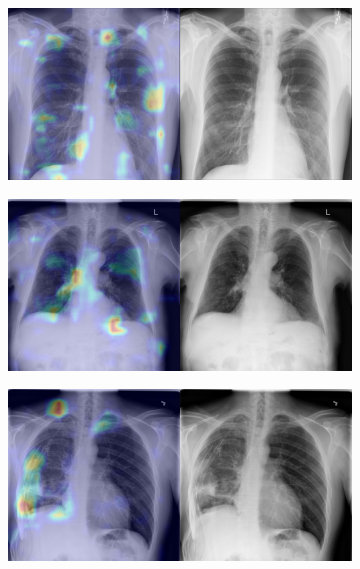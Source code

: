 \begin{figure}[b]
\begin{subfigure}{0.4\textwidth}
    \end{subfigure}
    \begin{subfigure}{0.4\textwidth}
        \centering
        \includegraphics[width=1.0\textwidth]{Chapters/5. Conclusiones/img/Emphysema/1_1_00012298_007.png}
    \end{subfigure}
    \begin{subfigure}{0.4\textwidth}
        \centering
        \includegraphics[width=1.0\textwidth]{Chapters/5. Conclusiones/img/Emphysema/1_1_00015387_000.png}
    \end{subfigure}
    \begin{subfigure}{0.4\textwidth}
        \centering
        \includegraphics[width=1.0\textwidth]{Chapters/5. Conclusiones/img/Emphysema/1_1_00023075_007.png}

\end{subfigure}
\end{figure}
